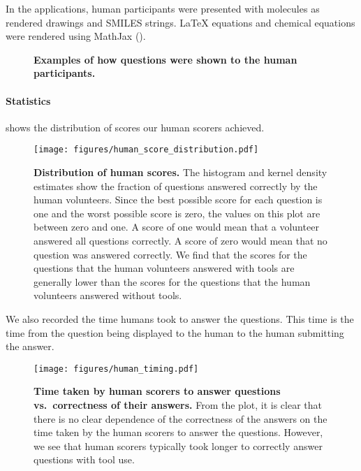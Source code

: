 In the applications, human participants were presented with molecules as rendered drawings and SMILES strings. \LaTeX\xspace equations and chemical equations were rendered using MathJax ().


\begin{figure}

    \caption{\textbf{Examples of how questions were shown to the human participants.}}
    \label{fig:screenshots}
\end{figure}

\paragraph{Statistics}
 shows the distribution of scores our human scorers achieved.

\begin{figure}[htb]
    \centering
    \texttt{[image: figures/human\_score\_distribution.pdf]}
    \caption{\textbf{Distribution of human scores.} The histogram and kernel density estimates show the fraction of questions answered correctly by the human volunteers.
    Since the best possible score for each question is one and the worst possible score is zero, the values on this plot are between zero and one. A score of one would mean that a volunteer answered all questions correctly. A score of zero would mean that no question was answered correctly.
    We find that the scores for the questions that the human volunteers answered with tools are generally lower than the scores for the questions that the human volunteers answered without tools.
    }
    \label{fig:human_score_distribution}
\end{figure}

We also recorded the time humans took to answer the questions. This time is the time from the question being displayed to the human to the human submitting the answer.

\begin{figure}[htb]
    \centering
    \texttt{[image: figures/human\_timing.pdf]}
    \caption{\textbf{Time taken by human scorers to answer questions vs.\ correctness of their answers.} From the plot, it is clear that there is no clear dependence of the correctness of the answers on the time taken by the human scorers to answer the questions. However, we see that human scorers typically took longer to correctly answer questions with tool use.}
    \label{fig:human_timing}
\end{figure}

